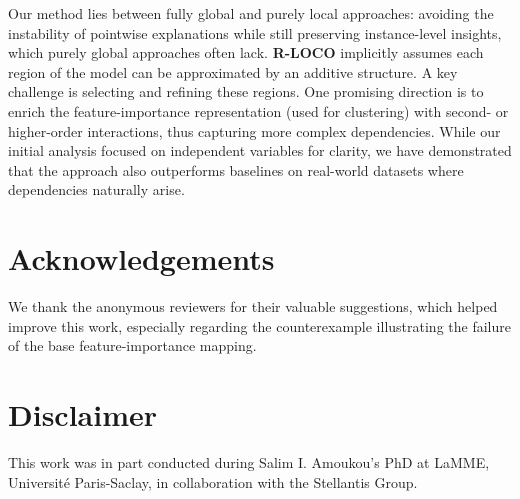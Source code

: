 \documentclass{article}
\theoremstyle{plain}
\theoremstyle{definition}
\theoremstyle{remark}
\newcommand{\ours}{\textcolor{ours}{\textbf{R-LOCO}}}
\begin{document}
Our method lies between fully global and purely local approaches: avoiding the instability of pointwise explanations while still preserving instance-level insights, which purely global approaches often lack. \ours{} implicitly assumes each region of the model can be approximated by an additive structure. A key challenge is selecting and refining these regions. One promising direction is to enrich the feature-importance representation (used for clustering) with second- or higher-order interactions, thus capturing more complex dependencies. While our initial analysis focused on independent variables for clarity, we have demonstrated that the approach also outperforms baselines on real-world datasets where dependencies naturally arise.

\section*{Acknowledgements}

We thank the anonymous reviewers for their valuable suggestions, which helped improve this work, especially regarding the counterexample illustrating the failure of the base feature-importance mapping.


\section*{Disclaimer}
This work was in part conducted during Salim I. Amoukou’s PhD at LaMME, Université Paris-Saclay, in collaboration with the Stellantis Group.






\appendix
\newpage
\end{document}
